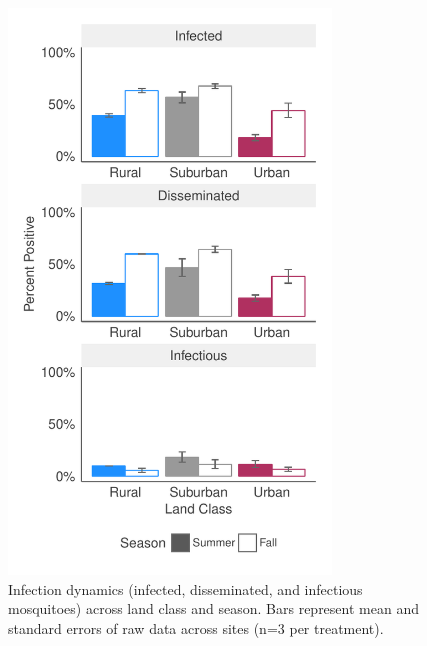 \documentclass[12pt]{article}
\begin{document}
\begin{figure}
\centering\includegraphics[height=15cm, keepaspectratio]{landclassXseasonInfection.pdf}
\caption{Infection dynamics (infected, disseminated, and infectious mosquitoes) across land class and season. Bars represent mean and standard errors of raw data across sites (n=3 per treatment).}
\label{Fig:Infxclass}
\end{figure}

\end{document}
